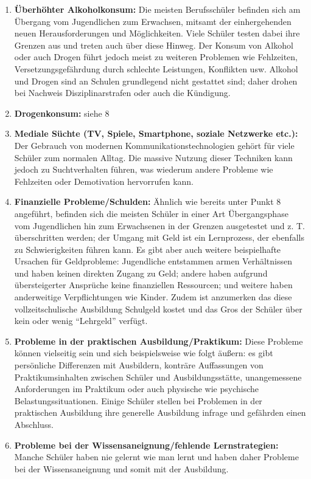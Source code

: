 \begin{enumerate}
	\item \textbf{Überhöhter Alkoholkonsum:} Die meisten Berufsschüler befinden sich am Übergang vom Jugendlichen zum Erwachsen, mitsamt der einhergehenden neuen Herausforderungen und Möglichkeiten. Viele Schüler testen dabei ihre Grenzen aus und treten auch über diese Hinweg. Der Konsum von Alkohol oder auch Drogen führt jedoch meist zu weiteren Problemen wie Fehlzeiten, Versetzungsgefährdung durch schlechte Leistungen, Konflikten usw. Alkohol und Drogen sind an Schulen grundlegend nicht gestattet sind; daher drohen bei Nachweis Disziplinarstrafen oder auch die Kündigung.
	\item \textbf{Drogenkonsum:} siehe 8
	\item \textbf{Mediale Süchte (TV, Spiele, Smartphone, soziale Netzwerke etc.):} Der Gebrauch von modernen Kommunikationstechnologien gehört für viele Schüler zum normalen Alltag. Die massive Nutzung dieser Techniken kann jedoch zu Suchtverhalten führen, was wiederum andere Probleme wie Fehlzeiten oder Demotivation hervorrufen kann.
	\item \textbf{Finanzielle Probleme/Schulden:} Ähnlich wie bereits unter Punkt 8 angeführt, befinden sich die meisten Schüler in einer Art Übergangsphase vom Jugendlichen hin zum Erwachsenen in der Grenzen ausgetestet und z. T. überschritten werden; der Umgang mit Geld ist ein Lernprozess, der ebenfalls zu Schwierigkeiten führen kann. Es gibt aber auch weitere beispielhafte Ursachen für Geldprobleme: Jugendliche entstammen armen Verhältnissen und haben keinen direkten Zugang zu Geld; andere haben aufgrund übersteigerter Ansprüche keine finanziellen Ressourcen; und weitere haben anderweitige Verpflichtungen wie Kinder. Zudem ist anzumerken das diese vollzeitschulische Ausbildung Schulgeld kostet und das Gros der Schüler über kein oder wenig "`Lehrgeld"' verfügt.
	\item \textbf{Probleme in der praktischen Ausbildung/Praktikum:} Diese Probleme können vielseitig sein und sich beispielsweise wie folgt äußern: es gibt persönliche Differenzen mit Ausbildern, konträre Auffassungen von Praktikumsinhalten zwischen Schüler und Ausbildungsstätte, unangemessene Anforderungen im Praktikum oder auch physische wie psychische Belastungssituationen. Einige Schüler stellen bei Problemen in der praktischen Ausbildung ihre generelle Ausbildung infrage und gefährden einen Abschluss.  
	\item \textbf{Probleme bei der Wissensaneignung/fehlende Lernstrategien:} Manche Schüler haben nie gelernt wie man lernt und haben daher Probleme bei der Wissensaneignung und somit mit der Ausbildung.

\end{enumerate}
